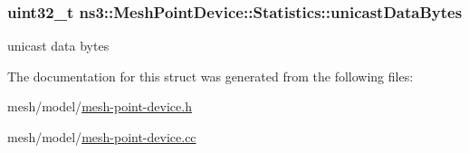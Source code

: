 \subsubsection[{\texorpdfstring{unicast\+Data\+Bytes}{unicastDataBytes}}]{\setlength{\rightskip}{0pt plus 5cm}uint32\+\_\+t ns3\+::\+Mesh\+Point\+Device\+::\+Statistics\+::unicast\+Data\+Bytes}\hypertarget{structns3_1_1MeshPointDevice_1_1Statistics_aac39836264b8ec7bf45143814b21aef8}{}\label{structns3_1_1MeshPointDevice_1_1Statistics_aac39836264b8ec7bf45143814b21aef8}


unicast data bytes 



The documentation for this struct was generated from the following files\+:\begin{DoxyCompactItemize}
\item 
mesh/model/\hyperlink{mesh-point-device_8h}{mesh-\/point-\/device.\+h}\item 
mesh/model/\hyperlink{mesh-point-device_8cc}{mesh-\/point-\/device.\+cc}\end{DoxyCompactItemize}
